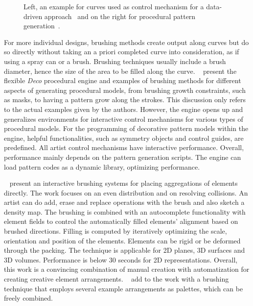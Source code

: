 \begin{figure}[H]
    \centering
    \caption{\label{fig:curves} Left, an example for curves used as control mechanism for a data-driven approach~\cite{lu_2014_dds} and on the right for procedural pattern generation~\cite{mech_2012_tdf}.}
\end{figure}

For more individual designs, brushing methods create output along curves but do so directly without taking an a priori completed curve into consideration, as if using a spray can or a brush. Brushing techniques usually include a brush diameter, hence the size of the area to be filled along the curve. \citeauthor*{mech_2012_tdf}~\cite{mech_2012_tdf} present the flexible \textit{Deco} procedural engine and examples of brushing methods for different aspects of generating procedural models, from brushing growth constraints, such as masks, to having a pattern grow along the strokes. This discussion only refers to the actual examples given by the authors. However, the engine opens up and generalizes environments for interactive control mechanisms for various types of procedural models. For the programming of decorative pattern models within the engine, helpful functionalities, such as symmetry objects and control guides, are predefined. All artist control mechanisms have interactive performance. Overall, performance mainly depends on the pattern generation scripts. The engine can load pattern codes as a dynamic library, optimizing performance. 

 \citeauthor*{hsu_2020_aef}~\cite{hsu_2020_aef} present an interactive brushing systems for placing aggregations of elements directly. The work focuses on an even distribution and on resolving collisions. An artist can do add, erase and replace operations with the brush and also sketch a density map. The brushing is combined with an autocomplete functionality with element fields to control the automatically filled elements' alignment based on brushed directions. Filling is computed by iteratively optimizing the scale, orientation and position of the elements. Elements can be rigid or be deformed through the packing. The technique is applicable for 2D planes, 3D surfaces and 3D volumes. Performance is below 30 seconds for 2D representations. Overall, this work is a convincing combination of manual creation with automatization for creating creative element arrangements. \citeauthor*{davison_2019_ief}~\cite{davison_2019_ief} add to the work with a brushing technique that employs several example arrangements as palettes, which can be freely combined. 

